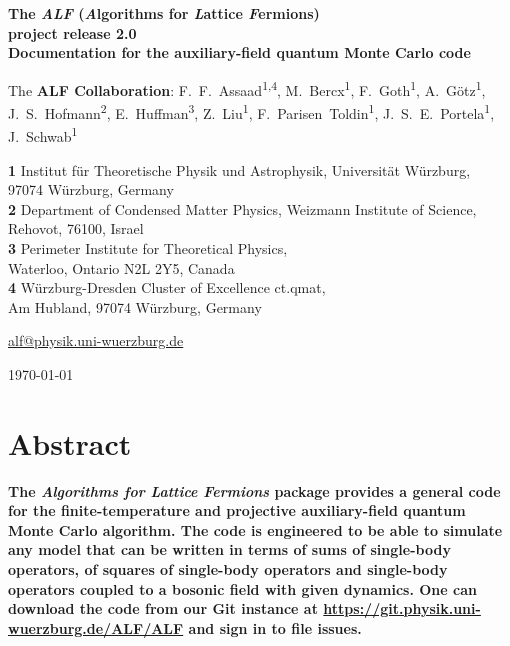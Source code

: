 \documentclass[submission, Phys]{SciPost}
\begin{document}
	
\begin{center}{\Large \textbf{
The \emph{ALF} (\emph{A}lgorithms for \emph{L}attice \emph{F}ermions)\\project release 2.0\\
{\normalsize Documentation for the  auxiliary-field quantum Monte Carlo code}
}}\end{center}

\begin{center}
The \textbf{ALF Collaboration}:
F.~F.~Assaad\textsuperscript{1,4},
M.~Bercx\textsuperscript{1},
F.~Goth\textsuperscript{1},
A.~G\"otz\textsuperscript{1},
J.~S.~Hofmann\textsuperscript{2},
E.~Huffman\textsuperscript{3},
Z.~Liu\textsuperscript{1},
F.~Parisen~Toldin\textsuperscript{1},
J.~S.~E.~Portela\textsuperscript{1},
J.~Schwab\textsuperscript{1}
\end{center}

\begin{center}
{\bf 1} Institut f\"ur Theoretische Physik und Astrophysik, Universit\"at W\"urzburg,\\
97074 W\"urzburg, Germany\\
{\bf 2} Department of Condensed Matter Physics, Weizmann Institute of Science,\\
Rehovot, 76100, Israel\\
{\bf 3} Perimeter Institute for Theoretical Physics,\\
Waterloo, Ontario N2L 2Y5, Canada\\
{\bf 4} W\"urzburg-Dresden Cluster of Excellence ct.qmat, \\ Am Hubland, 97074 W\"urzburg, Germany

\url{alf@physik.uni-wuerzburg.de}
\end{center}

\begin{center}
\today
\end{center}


\section*{Abstract}
{\bf
The \emph{Algorithms for Lattice Fermions} package provides a general code for the finite-temperature and projective auxiliary-field quantum Monte Carlo algorithm. The code is engineered to be able to simulate any model that can be written in terms of sums of single-body operators, of squares of single-body operators and single-body operators coupled to a bosonic field with given dynamics.
One can download the code from our Git instance at \url{https://git.physik.uni-wuerzburg.de/ALF/ALF} and sign in to file issues.} \\
\end{document}
